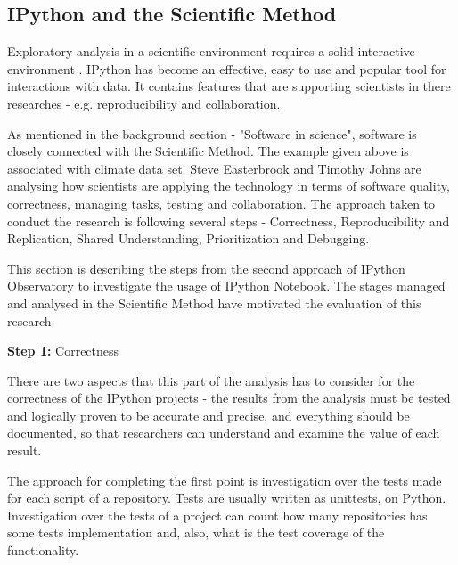\subsection{IPython and the Scientific Method}
\label{subsect:ipython_sci}

Exploratory analysis in a scientific environment requires a solid interactive environment \cite{ipythonArticle}. IPython has become an effective, easy to use and popular tool for interactions with data. It contains features that are supporting scientists in there researches - e.g. reproducibility and collaboration. 

As mentioned in the background section - "Software in science", software is closely connected with the Scientific Method\cite{sciMethod}. The example given above is associated with climate data set. Steve Easterbrook and Timothy Johns \cite{easterbrook2009engineering} are analysing how scientists are applying the technology in terms of software quality, correctness, managing tasks, testing and collaboration. The approach taken to conduct the research is following several steps - Correctness, Reproducibility and Replication, Shared Understanding, Prioritization and Debugging.

This section is describing the steps from the second approach of IPython Observatory to investigate the usage of IPython Notebook. The stages managed and analysed in the Scientific Method have motivated the evaluation of this research.


\vspace{5mm}
\begin{mdframed}
\vspace{1px}
\textbf{Step 1:} Correctness
\vspace{1px}
\end{mdframed}
\vspace{2mm}

There are two aspects that this part of the analysis has to consider for the correctness of the IPython projects - the results from the analysis must be tested and logically proven to be accurate and precise, and everything should be documented, so that researchers can understand and examine the value of each result. 

The approach for completing the first point is investigation over the tests made for each script of a repository. Tests are usually written as unittests, on Python. Investigation over the tests of a project can count how many repositories has some tests implementation and, also, what is the test coverage of the functionality.

